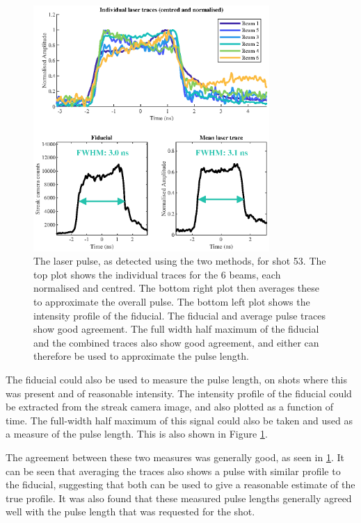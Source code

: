 \begin{figure} [h]
\begin{centering}
\includegraphics[width=0.8\textwidth]{figures/Experiment/FiduAndTrace.eps}%
\caption{\label{fig:Fidu and Trace} The laser pulse, as detected using the two methods, for shot 53. The top plot shows the individual traces for the 6 beams, each normalised and centred. The bottom right plot then averages these to approximate the overall pulse. The bottom left plot shows the intensity profile of the fiducial. The fiducial and average pulse traces show good agreement. The full width half maximum of the fiducial and the combined traces also show good agreement, and either can therefore be used to approximate the pulse length.}
\end{centering}
\end{figure}

The fiducial could also be used to measure the pulse length, on shots where this was present and of reasonable intensity. The intensity profile of the fiducial could be extracted from the streak camera image, and also plotted as a function of time. The full-width half maximum of this signal could also be taken and used as a measure of the pulse length. This is also shown in Figure \ref{fig:Fidu and Trace}.

The agreement between these two measures was generally good, as seen in \ref{fig:Fidu and Trace}. It can be seen that averaging the traces also shows a pulse with similar profile to the fiducial, suggesting that both can be used to give a reasonable estimate of the true profile. It was also found that these measured pulse lengths generally agreed well with the pulse length that was requested for the shot. 

